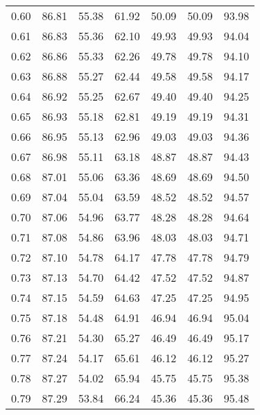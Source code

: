 \begin{tabular}{|c|c|c|c|c|c|c|}
      0.60 &     86.81 &     55.38 &      61.92 &   50.09 &      50.09 &         93.98 \\
      0.61 &     86.83 &     55.36 &      62.10 &   49.93 &      49.93 &         94.04 \\
      0.62 &     86.86 &     55.33 &      62.26 &   49.78 &      49.78 &         94.10 \\
      0.63 &     86.88 &     55.27 &      62.44 &   49.58 &      49.58 &         94.17 \\
      0.64 &     86.92 &     55.25 &      62.67 &   49.40 &      49.40 &         94.25 \\
      0.65 &     86.93 &     55.18 &      62.81 &   49.19 &      49.19 &         94.31 \\
      0.66 &     86.95 &     55.13 &      62.96 &   49.03 &      49.03 &         94.36 \\
      0.67 &     86.98 &     55.11 &      63.18 &   48.87 &      48.87 &         94.43 \\
      0.68 &     87.01 &     55.06 &      63.36 &   48.69 &      48.69 &         94.50 \\
      0.69 &     87.04 &     55.04 &      63.59 &   48.52 &      48.52 &         94.57 \\
      0.70 &     87.06 &     54.96 &      63.77 &   48.28 &      48.28 &         94.64 \\
      0.71 &     87.08 &     54.86 &      63.96 &   48.03 &      48.03 &         94.71 \\
      0.72 &     87.10 &     54.78 &      64.17 &   47.78 &      47.78 &         94.79 \\
      0.73 &     87.13 &     54.70 &      64.42 &   47.52 &      47.52 &         94.87 \\
      0.74 &     87.15 &     54.59 &      64.63 &   47.25 &      47.25 &         94.95 \\
      0.75 &     87.18 &     54.48 &      64.91 &   46.94 &      46.94 &         95.04 \\
      0.76 &     87.21 &     54.30 &      65.27 &   46.49 &      46.49 &         95.17 \\
      0.77 &     87.24 &     54.17 &      65.61 &   46.12 &      46.12 &         95.27 \\
      0.78 &     87.27 &     54.02 &      65.94 &   45.75 &      45.75 &         95.38 \\
      0.79 &     87.29 &     53.84 &      66.24 &   45.36 &      45.36 &         95.48 \\

\end{tabular}
